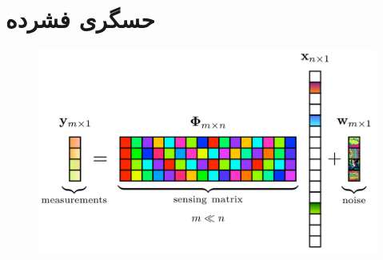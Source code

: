 \section{حسگری فشرده}\label{ch:background|sec:compresed-sensing}



\begin{figure}
	\centering
	\includegraphics[width=0.7\linewidth]{chapters/chapter-2/figs/compressed-sensig-general-settings}
	\caption{}
	\label{fig:compressed-sensig-general-settings}
\end{figure}





